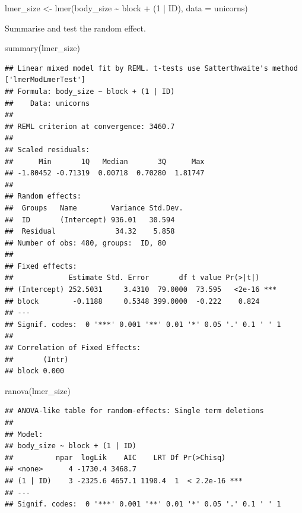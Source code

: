 \documentclass[
  12pt,
]{book}
\newenvironment{Shaded}{\begin{snugshade}}{\end{snugshade}}
\newcommand{\AttributeTok}[1]{\textcolor[rgb]{0.77,0.63,0.00}{#1}}
\newcommand{\DecValTok}[1]{\textcolor[rgb]{0.00,0.00,0.81}{#1}}
\newcommand{\FunctionTok}[1]{\textcolor[rgb]{0.00,0.00,0.00}{#1}}
\newcommand{\NormalTok}[1]{#1}
\newcommand{\OtherTok}[1]{\textcolor[rgb]{0.56,0.35,0.01}{#1}}
\newcommand{\SpecialCharTok}[1]{\textcolor[rgb]{0.00,0.00,0.00}{#1}}
\begin{document}
\begin{Shaded}
\begin{Highlighting}[]
\NormalTok{lmer\_size }\OtherTok{\textless{}{-}} \FunctionTok{lmer}\NormalTok{(body\_size }\SpecialCharTok{\textasciitilde{}}\NormalTok{ block }\SpecialCharTok{+}\NormalTok{ (}\DecValTok{1} \SpecialCharTok{|}\NormalTok{ ID),}
                \AttributeTok{data =}\NormalTok{ unicorns)}
\end{Highlighting}
\end{Shaded}

Summarise and test the random effect.

\begin{Shaded}
\begin{Highlighting}[]
\FunctionTok{summary}\NormalTok{(lmer\_size)}
\end{Highlighting}
\end{Shaded}

\begin{verbatim}
## Linear mixed model fit by REML. t-tests use Satterthwaite's method ['lmerModLmerTest']
## Formula: body_size ~ block + (1 | ID)
##    Data: unicorns
## 
## REML criterion at convergence: 3460.7
## 
## Scaled residuals: 
##      Min       1Q   Median       3Q      Max 
## -1.80452 -0.71319  0.00718  0.70280  1.81747 
## 
## Random effects:
##  Groups   Name        Variance Std.Dev.
##  ID       (Intercept) 936.01   30.594  
##  Residual              34.32    5.858  
## Number of obs: 480, groups:  ID, 80
## 
## Fixed effects:
##             Estimate Std. Error       df t value Pr(>|t|)    
## (Intercept) 252.5031     3.4310  79.0000  73.595   <2e-16 ***
## block        -0.1188     0.5348 399.0000  -0.222    0.824    
## ---
## Signif. codes:  0 '***' 0.001 '**' 0.01 '*' 0.05 '.' 0.1 ' ' 1
## 
## Correlation of Fixed Effects:
##       (Intr)
## block 0.000
\end{verbatim}

\begin{Shaded}
\begin{Highlighting}[]
\FunctionTok{ranova}\NormalTok{(lmer\_size)}
\end{Highlighting}
\end{Shaded}

\begin{verbatim}
## ANOVA-like table for random-effects: Single term deletions
## 
## Model:
## body_size ~ block + (1 | ID)
##          npar  logLik    AIC    LRT Df Pr(>Chisq)    
## <none>      4 -1730.4 3468.7                         
## (1 | ID)    3 -2325.6 4657.1 1190.4  1  < 2.2e-16 ***
## ---
## Signif. codes:  0 '***' 0.001 '**' 0.01 '*' 0.05 '.' 0.1 ' ' 1
\end{verbatim}
\end{document}
